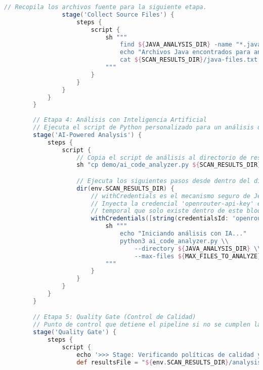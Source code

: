 \begin{lstlisting}[language=groovy, caption={Estructura completa del Jenkinsfile.}, label={lst:jenkinsfile}]
                // Recopila los archivos fuente para la siguiente etapa.
                stage('Collect Source Files') {
                    steps {
                        script {
                            sh """
                                find ${JAVA_ANALYSIS_DIR} -name "*.java" -type f > ${SCAN_RESULTS_DIR}/java-files.txt
                                echo "Archivos Java encontrados para análisis:"
                                cat ${SCAN_RESULTS_DIR}/java-files.txt
                            """
                        }
                    }
                }
            }
        }
        
        // Etapa 4: Análisis con Inteligencia Artificial
        // Ejecuta el script de Python personalizado para un análisis de seguridad profundo.
        stage('AI-Powered Analysis') {
            steps {
                script {
                    // Copia el script de análisis al directorio de resultados para aislar la ejecución.
                    sh "cp demo/ai_code_analyzer.py ${SCAN_RESULTS_DIR}/"

                    // Ejecuta los siguientes pasos desde dentro del directorio de resultados.
                    dir(env.SCAN_RESULTS_DIR) {
                        // withCredentials es el mecanismo seguro de Jenkins para manejar secretos.
                        // Inyecta la credencial 'openrouter-api-key' en una variable de entorno
                        // temporal que solo existe dentro de este bloque.
                        withCredentials([string(credentialsId: 'openrouter-api-key', variable: 'OPENROUTER_API_KEY')]) {
                            sh """
                                echo "Iniciando análisis con IA..."
                                python3 ai_code_analyzer.py \\
                                    --directory ${JAVA_ANALYSIS_DIR} \\
                                    --max-files ${MAX_FILES_TO_ANALYZE}
                            """
                        }
                    }
                }
            }
        }    

        // Etapa 5: Quality Gate (Control de Calidad)
        // Punto de control que detiene el pipeline si no se cumplen las políticas de seguridad.
        stage('Quality Gate') {
            steps {
                script {
                    echo '>>> Stage: Verificando políticas de calidad y seguridad...'
                    def resultsFile = "${env.SCAN_RESULTS_DIR}/analysis-results.json"
                    

\end{lstlisting}
